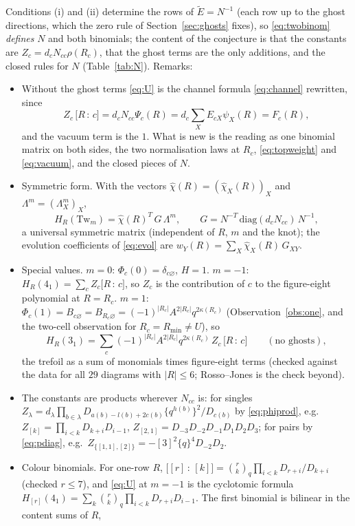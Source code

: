\documentclass[11pt]{article}
\newcommand{\Tw}{\mathrm{Tw}}
\newcommand{\Lam}{\Lambda}
\newcommand{\Et}{\widetilde{E}}
\newcommand{\vac}{\varnothing}
\newcommand{\chih}{\hat\chi}
\newcommand{\cf}[2]{\bigl[#1\,{:}\,#2\bigr]}
\begin{document}
Conditions (i) and (ii) determine the rows of $\Et=N^{-1}$ (each row up to the ghost directions, which the zero rule of
Section~\ref{sec:ghosts} fixes), so \eqref{eq:twobinom} \emph{defines} $N$ and both binomials; the content of the
conjecture is that the constants are $Z_c=d_cN_{cc}\rho(R_c)$, that the ghost terms are the only additions, and the closed
rules for $N$ (Table~\ref{tab:N}).  Remarks:
\begin{itemize}
\item[(a)] Without the ghost terms \eqref{eq:U} is the channel formula \eqref{eq:channel} rewritten, since
\[
Z_c\,\cf Rc=d_cN_{cc}\Psi_c(R)=d_c\sum_XE_{cX}\psi_X(R)=F_c(R),
\]
and the vacuum term is the $1$.  What is new is the reading as one binomial matrix on both sides, the two normalisation
laws at $R_c$, \eqref{eq:topweight} and \eqref{eq:vacuum}, and the closed pieces of $N$.
\item[(b)] Symmetric form.  With the vectors $\chih(R)=(\chih_X(R))_X$ and $\Lam^m=(\Lam_X^m)_X$,
\[
H_R(\Tw_m)=\chih(R)^{T}\,G\,\Lam^{m},\qquad G=N^{-T}\,\mathrm{diag}(d_cN_{cc})\,N^{-1},
\]
a universal symmetric matrix (independent of $R$, $m$ and the knot); the evolution coefficients of \eqref{eq:evol} are
$w_Y(R)=\sum_X\chih_X(R)\,G_{XY}$.
\item[(c)] Special values.  $m=0$: $\Phi_c(0)=\delta_{c\vac}$, $H=1$.  $m=-1$: $H_R(4_1)=\sum_cZ_c\cf Rc$, so $Z_c$ is the
contribution of $c$ to the figure-eight polynomial at $R=R_c$.  $m=1$: $\Phi_c(1)=B_{c\vac}=B_{R_c\vac}
=(-1)^{|R_c|}A^{2|R_c|}q^{2\kappa(R_c)}$ (Observation~\ref{obs:one}, and the two-cell observation for $R_c=R_{\min}\ne U$),
so
\[
H_R(3_1)=\sum_c(-1)^{|R_c|}A^{2|R_c|}q^{2\kappa(R_c)}\,Z_c\,\cf Rc\qquad(\text{no ghosts}),
\]
the trefoil as a sum of monomials times figure-eight terms (checked against the data for all $29$ diagrams with
$|R|\le6$; Rosso--Jones is the check beyond).
\item[(d)] The constants are products wherever $N_{cc}$ is: for singles $Z_\lambda=d_\lambda\prod_{b\in\lambda}
D_{a(b)-l(b)+2c(b)}\{q^{h(b)}\}^2/D_{c(b)}$ by \eqref{eq:phiprod}, e.g.\ $Z_{[k]}=\prod_{i<k}D_{k+i}D_{i-1}$,
$Z_{[2,1]}=D_{-3}D_{-2}D_{-1}D_1D_2D_3$; for pairs by \eqref{eq:pdiag}, e.g.\ $Z_{\{[1,1],[2]\}}=-[3]^2\{q\}^4D_{-2}D_2$.
\item[(e)] Colour binomials.  For one-row $R$, $\cf{[r]}{[k]}=\binom rk_q\prod_{i<k}D_{r+i}/D_{k+i}$ (checked $r\le7$), and
\eqref{eq:U} at $m=-1$ is the cyclotomic formula $H_{[r]}(4_1)=\sum_k\binom rk_q\prod_{i<k}D_{r+i}D_{i-1}$.  The first
binomial is bilinear in the content sums of $R$,

\end{itemize}
\end{document}
